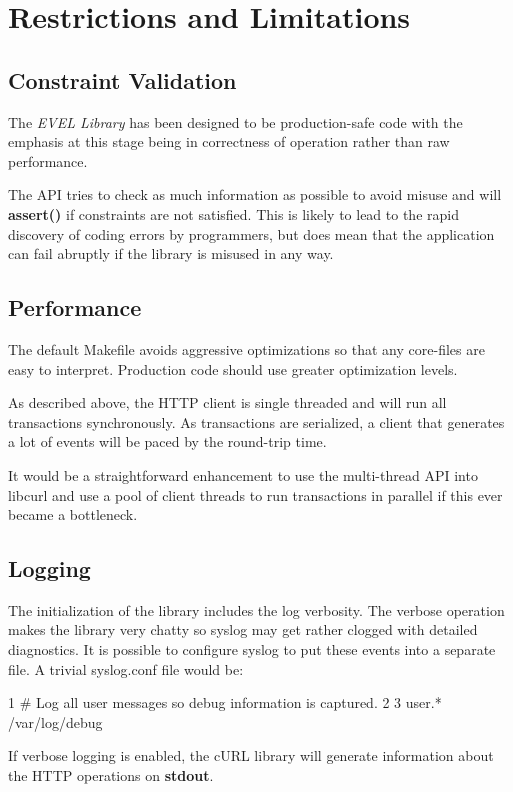 \section*{Restrictions and Limitations}

\subsection*{Constraint Validation}

The {\itshape E\+V\+E\+L Library} has been designed to be production-\/safe code with the emphasis at this stage being in correctness of operation rather than raw performance.

The A\+P\+I tries to check as much information as possible to avoid misuse and will {\bfseries assert()} if constraints are not satisfied. This is likely to lead to the rapid discovery of coding errors by programmers, but does mean that the application can fail abruptly if the library is misused in any way.

\subsection*{Performance}

The default Makefile avoids aggressive optimizations so that any core-\/files are easy to interpret. Production code should use greater optimization levels.

As described above, the H\+T\+T\+P client is single threaded and will run all transactions synchronously. As transactions are serialized, a client that generates a lot of events will be paced by the round-\/trip time.

It would be a straightforward enhancement to use the multi-\/thread A\+P\+I into libcurl and use a pool of client threads to run transactions in parallel if this ever became a bottleneck.

\subsection*{Logging}

The initialization of the library includes the log verbosity. The verbose operation makes the library very chatty so syslog may get rather clogged with detailed diagnostics. It is possible to configure syslog to put these events into a separate file. A trivial syslog.\+conf file would be\+:


\begin{DoxyCode}
1 # Log all user messages so debug information is captured.
2 
3 user.*      /var/log/debug
\end{DoxyCode}


If verbose logging is enabled, the c\+U\+R\+L library will generate information about the H\+T\+T\+P operations on {\bfseries stdout}. 